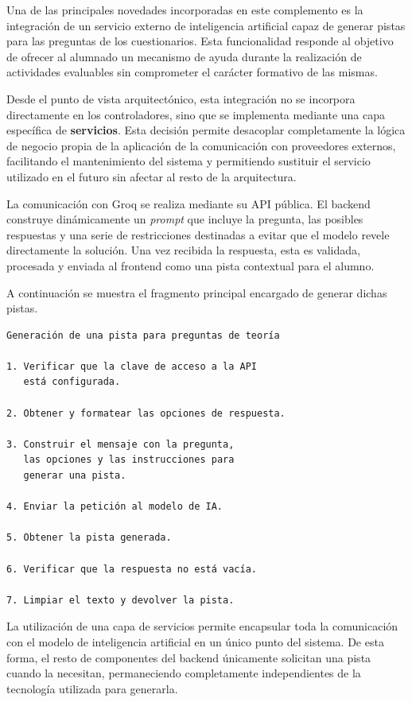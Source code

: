 Una de las principales novedades incorporadas en este complemento es la integración de un servicio externo de inteligencia artificial capaz de generar pistas para las preguntas de los cuestionarios. Esta funcionalidad responde al objetivo de ofrecer al alumnado un mecanismo de ayuda durante la realización de actividades evaluables sin comprometer el carácter formativo de las mismas.

Desde el punto de vista arquitectónico, esta integración no se incorpora directamente en los controladores, sino que se implementa mediante una capa específica de \textbf{servicios}. Esta decisión permite desacoplar completamente la lógica de negocio propia de la aplicación de la comunicación con proveedores externos, facilitando el mantenimiento del sistema y permitiendo sustituir el servicio utilizado en el futuro sin afectar al resto de la arquitectura.

La comunicación con Groq se realiza mediante su API pública. El backend construye dinámicamente un \textit{prompt} \cite{PromptEngineeringGuide} que incluye la pregunta, las posibles respuestas y una serie de restricciones destinadas a evitar que el modelo revele directamente la solución. Una vez recibida la respuesta, esta es validada, procesada y enviada al frontend como una pista contextual para el alumno.

A continuación se muestra el fragmento principal encargado de generar dichas pistas.

\begin{Verbatim}[frame=single, fontsize=\small]
Generación de una pista para preguntas de teoría

1. Verificar que la clave de acceso a la API
   está configurada.

2. Obtener y formatear las opciones de respuesta.

3. Construir el mensaje con la pregunta,
   las opciones y las instrucciones para
   generar una pista.

4. Enviar la petición al modelo de IA.

5. Obtener la pista generada.

6. Verificar que la respuesta no está vacía.

7. Limpiar el texto y devolver la pista.
\end{Verbatim}

La utilización de una capa de servicios permite encapsular toda la comunicación con el modelo de inteligencia artificial en un único punto del sistema. De esta forma, el resto de componentes del backend únicamente solicitan una pista cuando la necesitan, permaneciendo completamente independientes de la tecnología utilizada para generarla.

